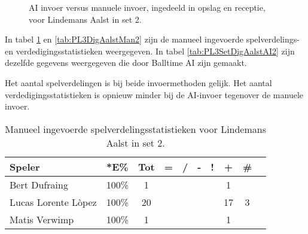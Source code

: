 \begin{figure}[ht]
\centering
{}
\caption{AI invoer versus manuele invoer, ingedeeld in opslag en receptie, voor Lindemans Aalst in set 2.}
\label{fig:PL3ServeReceiveAalst2}
\end{figure}

In tabel \ref{tab:PL3SetAalstMan2} en \ref{tab:PL3DigAalstMan2} zijn de manueel ingevoerde spelverdelings- en verdedigingsstatistieken weergegeven. In tabel \ref{tab:PL3SetDigAalstAI2} zijn dezelfde gegevens weergegeven die door Balltime AI zijn gemaakt.

Het aantal spelverdelingen is bij beide invoermethoden gelijk. Het aantal verdedigingsstatistieken is opnieuw minder bij de AI-invoer tegenover de manuele invoer.

\begin{table}[ht!]
    \centering
    \scriptsize
    \begin{tabular}{|l|c|c|c|c|c|c|c|c|c|}
        \hline
        \textbf{Speler} & *E\% & Tot & = & / & - & ! & + & \# \\ \hline
        Bert Dufraing & 100\% & 1 &  &  & &  & 1 & \\ 
        Lucas Lorente Lòpez & 100\% & 20 &  &  & & & 17 & 3 \\ 
        Matis Verwimp & 100\% & 1 & & & & & 1 & \\ \hline
    \end{tabular}
    \caption[Manueel ingevoerde spelverdelingsstatistieken voor Lindemans Aalst in set 2]{\label{tab:PL3SetAalstMan2}Manueel ingevoerde spelverdelingsstatistieken voor Lindemans Aalst in set 2.}
\end{table}

